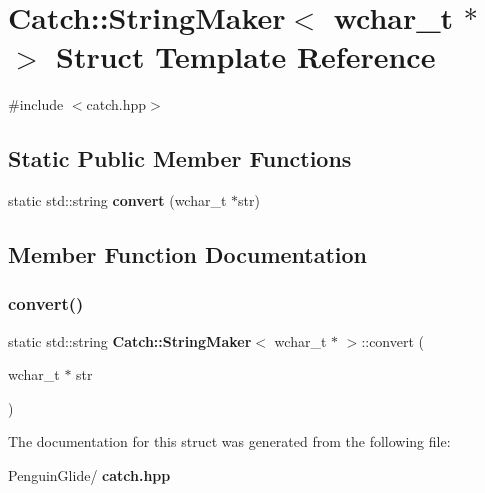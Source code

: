 \section{Catch\+::String\+Maker$<$ wchar\+\_\+t $\ast$ $>$ Struct Template Reference}
\label{struct_catch_1_1_string_maker_3_01wchar__t_01_5_01_4}


{\ttfamily \#include $<$catch.\+hpp$>$}

\subsection*{Static Public Member Functions}
\begin{DoxyCompactItemize}
\item 
static std\+::string \textbf{ convert} (wchar\+\_\+t $\ast$str)
\end{DoxyCompactItemize}


\subsection{Member Function Documentation}
\mbox{\label{struct_catch_1_1_string_maker_3_01wchar__t_01_5_01_4_a6112fe324da2a0b3a690071a228ecd71}} 
\subsubsection{convert()}
{\footnotesize\ttfamily static std\+::string \textbf{ Catch\+::\+String\+Maker}$<$ wchar\+\_\+t $\ast$ $>$\+::convert (\begin{DoxyParamCaption}\item[{wchar\+\_\+t $\ast$}]{str }\end{DoxyParamCaption})\hspace{0.3cm}{\ttfamily [static]}}



The documentation for this struct was generated from the following file\+:\begin{DoxyCompactItemize}
\item 
Penguin\+Glide/\textbf{ catch.\+hpp}\end{DoxyCompactItemize}
